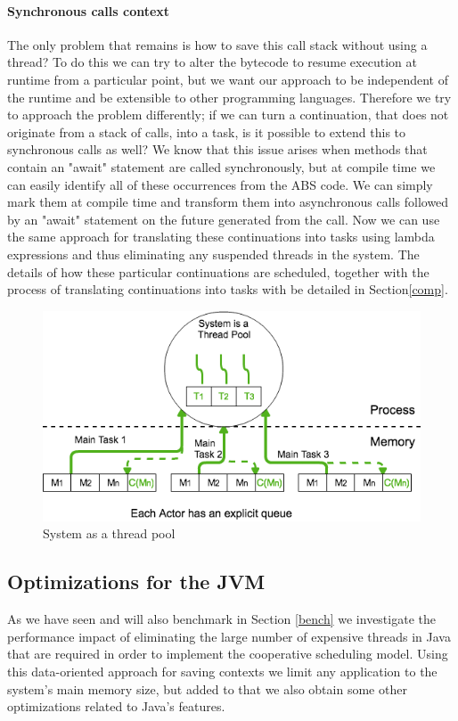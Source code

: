 \paragraph{Synchronous calls context}

The only problem that remains is how to save this call stack without using a thread? To do this we can try to alter the bytecode to resume execution at runtime from a particular point, but we want our approach to be independent of the runtime and be extensible to other programming languages. Therefore we try to approach the problem differently; if we can turn a continuation, that does not originate from a stack of calls, into a task, is it possible to extend this to synchronous calls as well? We know that this issue arises when methods that contain an "await" statement are called synchronously, but at compile time we can easily identify all of these occurrences from the ABS code. We can simply mark them at compile time and transform them into asynchronous calls followed by an "await" statement on the future generated from the call. Now we can use the same approach for translating these continuations into tasks using lambda expressions and thus eliminating any suspended threads in the system. The details of how these particular continuations are scheduled, together with the process of translating continuations into tasks with be detailed in Section\ref{comp}. 

\begin{figure}
	\label{sol}
	\centering
	\includegraphics[scale=0.5]{solution.png}
	\caption{System as a thread pool}
\end{figure}

\subsection{Optimizations for the JVM}
As we have seen and will also benchmark in Section \ref{bench} we investigate the performance impact of eliminating the large number of expensive threads in Java that are required in order to implement the cooperative scheduling model. Using this data-oriented approach for saving contexts we limit any application to the system's main memory size, but added to that we also obtain some other optimizations related to Java's features.

